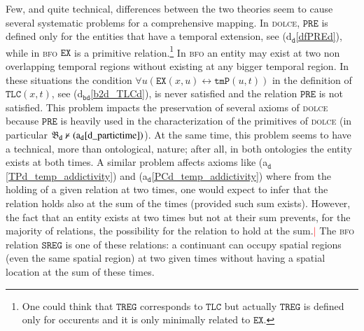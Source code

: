 \documentclass[ao]{iosart2x}
\newcommand{\nb}[1]{\textcolor{red}{$|$}\marginpar{\hspace*{-0cm}\parbox{20mm}{\scriptsize\raggedright\textcolor{red}{#1}}}}
\newcommand{\dolceAxLabel}{\textrm{a$_\texttt{d}$}}
\newcommand{\dolceDefLabel}{\textrm{d$_\texttt{d}$}}
\newcommand{\bdDefLabel}{\textrm{d$_\texttt{bd}$}}
\newcommand{\bdThrLabel}{\textrm{t$_\texttt{bd}$}}
\newcommand{\refdolceax}[1]{({\dolceAxLabel}\ref{#1})}
\newcommand{\refdolcedf}[1]{({\dolceDefLabel}\ref{#1})}
\newcommand{\refbddf}[1]{({\bdDefLabel}\ref{#1})}
\newcommand{\refbdth}[1]{({\bdThrLabel}\ref{#1})}
\newcommand{\pr}[1]{\mathtt{#1}}
\newcommand{\ifif}{\leftrightarrow}
\newcommand{\dolce}{{\textsc{dolce}}}
\newcommand{\bfo}{{\textsc{bfo}}}
\newcommand {\thbfobdmap} {\ensuremath{\mathfrak{B}_\texttt{d}}}
\newcommand {\PREd} {\ensuremath{\pr{PRE}}}
\newcommand {\TLCd} {\ensuremath{\pr{TLC}}}
\newcommand{\bfotpart}{\pr{tmP}}
\newcommand{\bfoexist}{\pr{EX}}
\newcommand{\bfosregof}{\pr{SREG}}
\newcommand{\bfotregof}{\pr{TREG}}
\begin{document}
Few, and quite technical, differences between the two theories seem to cause several systematic problems for a comprehensive mapping. In {\dolce}, $\PREd$ is defined only for the entities that have a temporal extension, see \refdolcedf{dfPREd}, while in {\bfo} $\bfoexist$ is a primitive relation.\footnote{One could think that $\bfotregof$ corresponds to $\TLCd$ but actually $\bfotregof$ is defined only for occurents and it is only minimally related to $\bfoexist$.} %
In {\bfo} an entity may exist at two non overlapping temporal regions without existing at any bigger temporal region. In these situations the condition $\forall u(\bfoexist(x,u) \ifif \bfotpart(u,t))$ in the definition of $\TLCd(x,t)$, see \refbddf{b2d_TLCd}, is never satisfied and the relation $\PREd$ is not satisfied. This problem impacts the preservation of several axioms of {\dolce}  %
because $\PREd$ is heavily used in the characterization of the primitives of {\dolce} (in particular ${\thbfobdmap \nvdash \refdolceax{d_partictime}}$). At the same time, this problem seems to have a technical, more than ontological, nature; after all, in both ontologies the entity exists at both times. A similar problem affects axioms like  \refdolceax{TPd_temp_addictivity} and \refdolceax{PCd_temp_addictivity} where from the holding of a given relation at two times, one would expect to infer that the relation holds also at the sum of the times (provided such sum exists). 
However, the fact that an entity exists at two times but not at their sum prevents, for the majority of relations, the possibility for the relation to hold at the sum.\nb{CM: la frase che avevi scritto tu secondo me non andava bene, ho quindi rimesso la precedente modificandola un po'}
%
%
The {\bfo} relation $\bfosregof$ is one of these relations: a continuant can occupy spatial regions (even the same spatial region) at two given times without having a spatial location at the sum of these times. %
\end{document}
